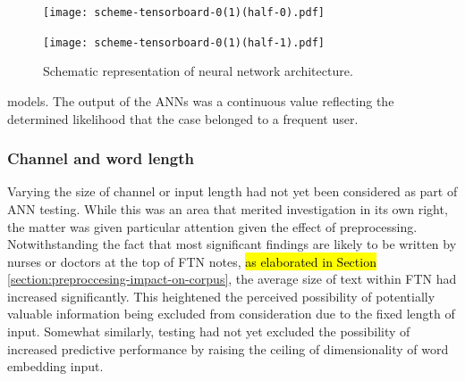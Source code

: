 
\begin{landscape}
   \begin{figure}[tpb]
   
      \centering
      \begin{topbot}

      \texttt{[image: scheme-tensorboard-0(1)(half-0).pdf]}
      \end{topbot}
      

   \end{figure}
\end{landscape}   

\begin{landscape}
   \begin{figure}[tpb]
   
      \centering
      \begin{bottombot}

      \texttt{[image: scheme-tensorboard-0(1)(half-1).pdf]}
      \end{bottombot}
      \caption{Schematic representation of neural network architecture.}
      \label{fig:scheme-tensorboard}
   \end{figure}
\end{landscape}   

\noindent models. The output of the ANNs was a continuous value reflecting the determined likelihood that the case belonged to a frequent user.

\subsubsection{Channel and word length}

Varying the size of channel or input length had not yet been considered as part of ANN testing. While this was an area that merited investigation in its own right, the matter was given particular attention given the effect of preprocessing. Notwithstanding the fact that most significant findings are likely to be written by nurses or doctors at the top of FTN notes, \hl{as elaborated in Section} \ref{section:preproccesing-impact-on-corpus}, the average size of text within FTN had increased significantly. This heightened the perceived possibility of potentially valuable information being excluded from consideration due to the fixed length of input. Somewhat similarly, testing had not yet excluded the possibility of increased predictive performance by raising the ceiling of dimensionality of word embedding input.  


